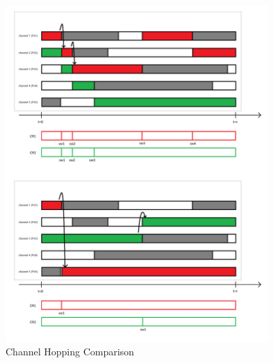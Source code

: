 \begin{figure}[ht]
\centering
\includegraphics[width=10cm]{figures/channel_hopping.png}
\caption{Channel Hopping Comparison}
\label{fig:channel_hopping}
\end{figure}

